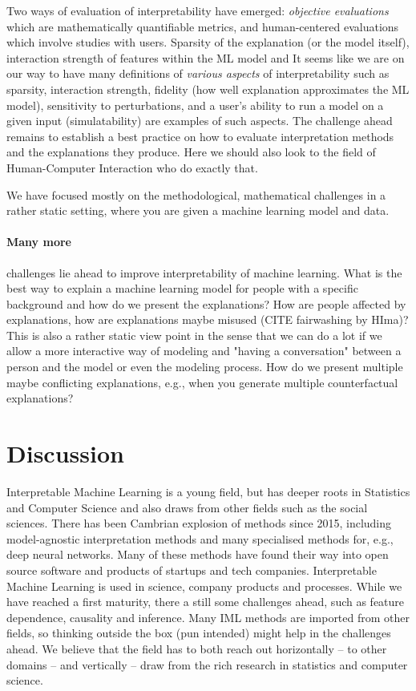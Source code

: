 \documentclass[runningheads]{llncs}
\begin{document}
Two ways of evaluation of interpretability have emerged: \textit{objective evaluations} which are mathematically quantifiable metrics, and {human-centered evaluations} which involve studies with users.
Sparsity of the explanation (or the model itself), interaction strength of features within the ML model and
It seems like we are on our way to have many definitions of \textit{various aspects} of interpretability such as sparsity, interaction strength, fidelity (how well explanation approximates the ML model), sensitivity to perturbations,  and a user's ability to run a model on a given input (simulatability) are examples of such aspects.
The challenge ahead remains to establish a best practice on how to evaluate interpretation methods and the explanations they produce.
Here we should also look to the field of Human-Computer Interaction who do exactly that.

We have focused mostly on the methodological, mathematical challenges in a rather static setting, where you are given a machine learning model and data.
\paragraph{Many more} challenges lie ahead to improve interpretability of machine learning.
What is the best way to explain a machine learning model for people with a specific background and how do we present the explanations?
How are people affected by explanations, how are explanations maybe misused (CITE fairwashing by HIma)?
This is also a rather static view point in the sense that we can do a lot if we allow a more interactive way of modeling and "having a conversation" between a person and the model or even the modeling process.
How do we present multiple maybe conflicting explanations, e.g., when you generate multiple counterfactual explanations?

\section*{Discussion}

Interpretable Machine Learning is a young field, but has deeper roots in Statistics and Computer Science and also draws from other fields such as the social sciences.
There has been Cambrian explosion of methods since 2015, including model-agnostic interpretation methods and many specialised methods for, e.g., deep neural networks.
Many of these methods have found their way into open source software and products of startups and tech companies.
Interpretable Machine Learning is used in science, company products and processes.
While we have reached a first maturity, there a still some challenges ahead, such as feature dependence, causality and inference.
Many IML methods are imported from other fields, so thinking outside the box (pun intended) might help in the challenges ahead.
We believe that the field has to both reach out horizontally -- to other domains -- and vertically -- draw from the rich research in statistics and computer science.


%
%
%
% 
%

\vskip 0.2in


\end{document}
